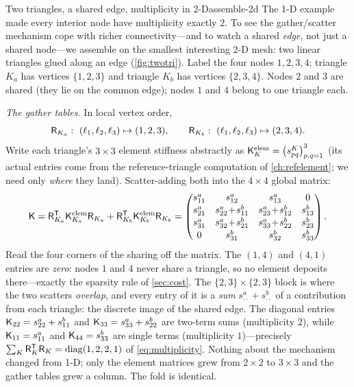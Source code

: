 \begin{workedexample}{Two triangles, a shared edge, multiplicity in 2-D}{assemble-2d}
\label{wex:assemble-2d}
The 1-D example made every interior node have multiplicity exactly $2$. To see
the gather/scatter mechanism cope with richer connectivity---and to watch a shared
\emph{edge}, not just a shared node---we assemble on the smallest interesting 2-D
mesh: two linear triangles glued along an edge (\cref{fig:twotri}). Label the four
nodes $1,2,3,4$; triangle $K_a$ has vertices $\{1,2,3\}$ and triangle $K_b$ has
vertices $\{2,3,4\}$. Nodes $2$ and $3$ are shared (they lie on the common edge);
nodes $1$ and $4$ belong to one triangle each.

\emph{The gather tables.} In local vertex order,
\[
\mat{R}_{K_a}:\ (\ell_1,\ell_2,\ell_3)\mapsto(1,2,3),
\qquad
\mat{R}_{K_b}:\ (\ell_1,\ell_2,\ell_3)\mapsto(2,3,4).
\]
Write each triangle's $3\times3$ element stiffness abstractly as
$\mathsf{K}^{\mathrm{elem}}_{K}=\bigl(s^K_{pq}\bigr)_{p,q=1}^3$ (its actual entries
come from the reference-triangle computation of \cref{ch:refelement}; we need only
\emph{where} they land). Scatter-adding both into the $4\times4$ global matrix:
\[
\mat{K}=\mat{R}_{K_a}^{\mathsf T}\mat{K}^{\mathrm{elem}}_{K_a}\mat{R}_{K_a}
       +\mat{R}_{K_b}^{\mathsf T}\mat{K}^{\mathrm{elem}}_{K_b}\mat{R}_{K_b}
=\begin{pmatrix}
s^a_{11} & s^a_{12} & s^a_{13} & 0\\[1pt]
s^a_{21} & s^a_{22}\!+\!s^b_{11} & s^a_{23}\!+\!s^b_{12} & s^b_{13}\\[1pt]
s^a_{31} & s^a_{32}\!+\!s^b_{21} & s^a_{33}\!+\!s^b_{22} & s^b_{23}\\[1pt]
0 & s^b_{31} & s^b_{32} & s^b_{33}
\end{pmatrix}.
\]
Read the four corners of the sharing off the matrix. The $(1,4)$ and $(4,1)$
entries are \emph{zero}: nodes $1$ and $4$ never share a triangle, so no element
deposits there---exactly the sparsity rule of \cref{sec:cost}. The
$\{2,3\}\times\{2,3\}$ block is where the two scatters \emph{overlap}, and every
entry of it is a \emph{sum} $s^a_{\cdot\cdot}+s^b_{\cdot\cdot}$ of a contribution
from each triangle: the discrete image of the shared edge. The diagonal entries
$\mathsf{K}_{22}=s^a_{22}+s^b_{11}$ and $\mathsf{K}_{33}=s^a_{33}+s^b_{22}$ are two-term
sums (multiplicity $2$), while $\mathsf{K}_{11}=s^a_{11}$ and $\mathsf{K}_{44}=s^b_{33}$
are single terms (multiplicity $1$)---precisely
$\sum_K\mathsf{R}_K^{\mathsf T}\mathsf{R}_K=\operatorname{diag}(1,2,2,1)$ of
\cref{eq:multiplicity}. Nothing about the mechanism changed from 1-D; only the
element matrices grew from $2\times2$ to $3\times3$ and the gather tables grew a
column. The fold is identical.
\end{workedexample}

